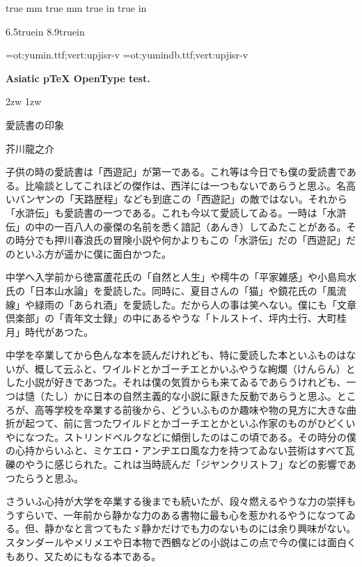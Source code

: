  true mm
 true mm
 true in
 true in

\tate%
{}

\iftdir
  \vsize6.5truein
  \hsize8.9truein
\fi

\tfont\yumin=ot:yumin.ttf;vert:upjisr-v
\tfont\yumindb=ot:yumindb.ttf;vert:upjisr-v
{{\noindent\yumin\bf Asiatic {p\TeX} OpenType test.\par}}

\parindent2zw
\parskip1zw

\centerline{\yumindb 愛読書の印象}
\centerline{\yumindb 芥川龍之介}

\bigskip

\yumin
子供の時の愛読書は「西遊記」が第一である。これ等は今日でも僕の愛読書である。比喩談としてこれほどの傑作は、西洋には一つもないであらうと思ふ。名高いバンヤンの「天路歴程」なども到底この「西遊記」の敵ではない。それから「水滸伝」も愛読書の一つである。これも今以て愛読してゐる。一時は「水滸伝」の中の一百八人の豪傑の名前を悉く諳記（あんき）してゐたことがある。その時分でも押川春浪氏の冒険小説や何かよりもこの「水滸伝」だの「西遊記」だのといふ方が遥かに僕に面白かつた。

中学へ入学前から徳富蘆花氏の「自然と人生」や樗牛の「平家雑感」や小島烏水氏の「日本山水論」を愛読した。同時に、夏目さんの「猫」や鏡花氏の「風流線」や緑雨の「あられ酒」を愛読した。だから人の事は笑へない。僕にも「文章倶楽部」の「青年文士録」の中にあるやうな「トルストイ、坪内士行、大町桂月」時代があつた。

中学を卒業してから色んな本を読んだけれども、特に愛読した本といふものはないが、概して云ふと、ワイルドとかゴーチエとかいふやうな絢爛（けんらん）とした小説が好きであつた。それは僕の気質からも来てゐるであらうけれども、一つは慥（たし）かに日本の自然主義的な小説に厭きた反動であらうと思ふ。ところが、高等学校を卒業する前後から、どういふものか趣味や物の見方に大きな曲折が起つて、前に言つたワイルドとかゴーチエとかといふ作家のものがひどくいやになつた。ストリンドベルクなどに傾倒したのはこの頃である。その時分の僕の心持からいふと、ミケエロ・アンヂエロ風な力を持つてゐない芸術はすべて瓦礫のやうに感じられた。これは当時読んだ「ジヤンクリストフ」などの影響であつたらうと思ふ。

さういふ心持が大学を卒業する後までも続いたが、段々燃えるやうな力の崇拝もうすらいで、一年前から静かな力のある書物に最も心を惹かれるやうになつてゐる。但、静かなと言つてもたゞ静かだけでも力のないものには余り興味がない。スタンダールやメリメエや日本物で西鶴などの小説はこの点で今の僕には面白くもあり、又ためにもなる本である。

